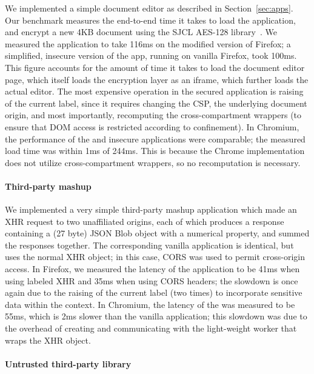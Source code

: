 We implemented a simple document editor as described in
Section~\ref{sec:apps}.
%
Our benchmark measures the end-to-end time it takes to load the
application, and encrypt a new 4KB document using
the SJCL AES-128 library~\cite{sjcl}.
%
We measured the \sys{} application to take 116ms on the modified
version of Firefox; a simplified, insecure version of the app,
running on vanilla Firefox, took 100ms.
%
This figure accounts for the amount of time it takes to
load the document editor page, which itself loads the encryption layer
as an iframe, which further loads the actual editor.
%
The most expensive operation in the secured application
is raising of the current label, since it requires changing the CSP, the
underlying document origin, and most importantly, recomputing the
cross-compartment wrappers (to ensure that DOM access is restricted
according to confinement).
%
In Chromium, the performance of the \sys{} and insecure applications
were comparable; the measured load time was within 1ms of 244ms.
%
This is because the Chrome implementation does not utilize cross-compartment
wrappers, so no recomputation is necessary.


\paragraph{Third-party mashup}

We implemented a very simple third-party mashup application which
made an XHR request to two unaffiliated origins, each
of which produces a response containing a (27 byte) JSON Blob
object with a numerical property, and summed the responses
together.
%
The corresponding vanilla application is identical, but uses the normal
XHR object; in this case, CORS was used to permit cross-origin access.
%
In Firefox, we measured the latency of the application to be 41ms when
using labeled XHR and 35ms when using CORS headers; the slowdown is once
again due to the raising of the current label (two times) to incorporate
sensitive data within the context.
%
In Chromium, the latency of the \sys{} was measured to be 55ms, 
which is 2ms slower than the vanilla application; this
slowdown was due to the overhead of creating and communicating with the light-weight worker
that wraps the XHR object.

\paragraph{Untrusted third-party library}


